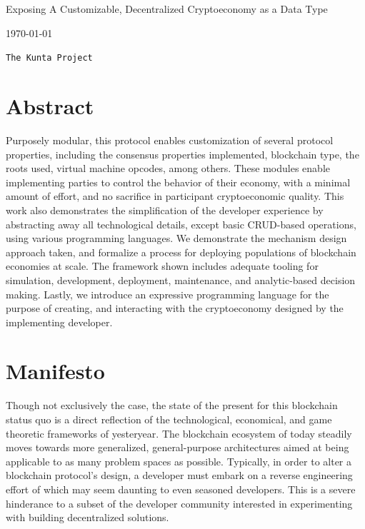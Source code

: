 \documentclass[12pt, titlepage, twocolumn]{report}
\date{\today}
\date{}
\begin{document}
\begin{titlepage}

\protect\parbox{.9\textwidth}
	{\protect\centering 
		\huge Exposing A Customizable, Decentralized Cryptoeconomy as a Data Type 
	}
\begin{center}
{\LARGE
\today}
\end{center}

\vfill
{
\Large
\begin{center}
\texttt{The Kunta Project} \\
\texttt{\boldtf{[v0.0.1]}}
\end{center}
}
 



\vfill
\section*{Abstract}
\noindent

Purposely modular, this protocol enables customization of several protocol properties, including the consensus properties implemented, blockchain type, the roots used, virtual machine opcodes, among others. These modules enable implementing parties to control the behavior of their economy, with a minimal amount of effort, and no sacrifice in participant cryptoeconomic quality. This work also demonstrates the simplification of the developer experience by abstracting away all technological details, except basic CRUD-based operations, using various programming languages. We demonstrate the mechanism design approach taken, and formalize a process for deploying populations of blockchain economies at scale. The framework shown includes adequate tooling for simulation, development, deployment, maintenance, and analytic-based decision making. Lastly, we introduce an expressive programming language for the purpose of creating, and interacting with the cryptoeconomy designed by the implementing developer.

\end{titlepage}


\tableofcontents
\listoffigures

\renewcommand\listoflistingscaption{List of Code Snippets}
\listoflistings

\clearpage


\onecolumn
\section{Manifesto}

Though not exclusively the case, the state of the present for this blockchain status quo is a direct reflection of the technological, economical, and game theoretic frameworks of yesteryear. The blockchain ecosystem of today steadily moves towards more generalized, general-purpose architectures aimed at being applicable to as many problem spaces as possible. Typically, in order to alter a blockchain protocol's design, a developer must embark on a reverse engineering effort of which may seem daunting to even seasoned developers. This is a severe hinderance to a subset of the developer community interested in experimenting with building decentralized solutions.
\end{document}
